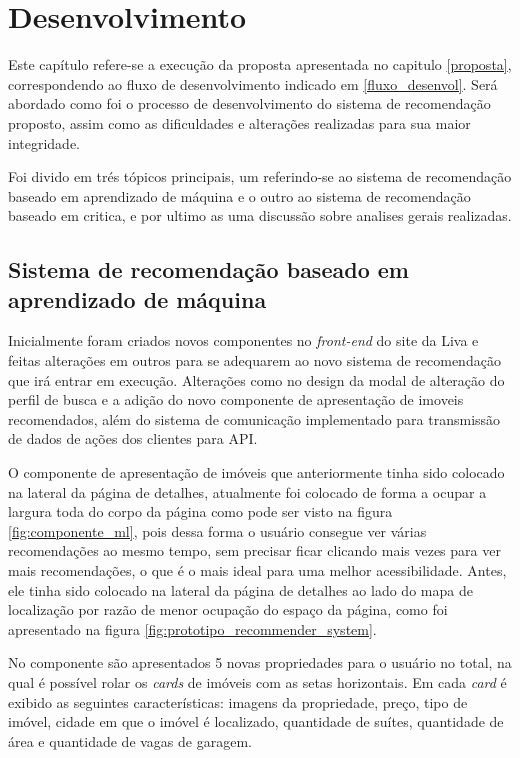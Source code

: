 \chapter{Desenvolvimento}
\label{desenvolvimento}

Este capítulo refere-se a execução da proposta apresentada no capitulo \ref{proposta}, correspondendo ao fluxo de desenvolvimento indicado em \ref{fluxo_desenvol}. Será abordado como foi o processo de desenvolvimento do sistema de recomendação proposto, assim como as dificuldades e alterações realizadas para sua maior integridade.

Foi divido em trés tópicos principais, um referindo-se ao sistema de recomendação baseado em aprendizado de máquina e o outro ao sistema de recomendação baseado em critica, e por ultimo as uma discussão sobre analises gerais realizadas.

\section{Sistema de recomendação baseado em aprendizado de máquina}

Inicialmente foram criados novos componentes no \textit{front-end} do site da Liva e feitas alterações em outros para se adequarem ao novo sistema de recomendação que irá entrar em execução. Alterações como no design da modal de alteração do perfil de busca e a adição do novo componente de apresentação de imoveis recomendados, além do sistema de comunicação implementado para transmissão de dados de ações dos clientes para API.

O componente de apresentação de imóveis que anteriormente tinha sido colocado na lateral da página de detalhes, atualmente foi colocado de forma a ocupar a largura toda do corpo da página como pode ser visto na figura \ref{fig:componente_ml}, pois dessa forma o usuário consegue ver várias recomendações ao mesmo tempo, sem precisar ficar clicando mais vezes para ver mais recomendações, o que é o mais ideal para uma melhor acessibilidade. Antes, ele tinha sido colocado na lateral da página de detalhes ao lado do mapa de localização por razão de menor ocupação do espaço da página, como foi apresentado na figura \ref{fig:prototipo_recommender_system}.

No componente são apresentados 5 novas propriedades para o usuário no total, na qual é possível rolar os \textit{cards} de imóveis com as setas horizontais. Em cada \textit{card} é exibido as seguintes características: imagens da propriedade, preço, tipo de imóvel, cidade em que o imóvel é localizado, quantidade de suítes, quantidade de área e quantidade de vagas de garagem.

